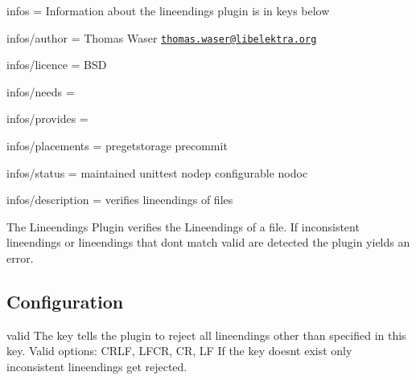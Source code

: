 
\begin{DoxyItemize}
\item infos = Information about the lineendings plugin is in keys below
\item infos/author = Thomas Waser \href{mailto:thomas.waser@libelektra.org}{\tt thomas.\+waser@libelektra.\+org}
\item infos/licence = B\+SD
\item infos/needs =
\item infos/provides =
\item infos/placements = pregetstorage precommit
\item infos/status = maintained unittest nodep configurable nodoc
\item infos/description = verifies lineendings of files
\end{DoxyItemize}

The Lineendings Plugin verifies the Lineendings of a file. If inconsistent lineendings or lineendings that don\textquotesingle{}t match {\ttfamily valid} are detected the plugin yields an error.

\subsection*{Configuration}

{\ttfamily valid} The key tells the plugin to reject all lineendings other than specified in this key. Valid options\+: C\+R\+LF, L\+F\+CR, CR, LF If the key doesn\textquotesingle{}t exist only inconsistent lineendings get rejected. 